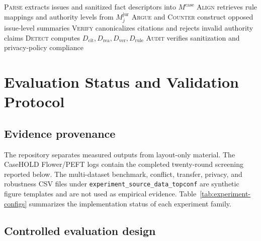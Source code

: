 \documentclass[preprint,12pt,authoryear]{elsarticle}
\begin{document}
\begin{algorithm}[t]
\caption{Policy-gated data-local multi-agent judicial deliberation}
\label{alg:deliberation}
\DontPrintSemicolon
{}
\textsc{Parse} extracts issues and sanitized fact descriptors into $M^{\mathrm{case}}$\;
\textsc{Align} retrieves rule mappings and authority levels from $M^{\mathrm{jur}}_j$\;
\textsc{Argue} and \textsc{Counter} construct opposed issue-level summaries\;
\textsc{Verify} canonicalizes citations and rejects invalid authority claims\;
\textsc{Detect} computes $D_{\mathrm{cit}},D_{\mathrm{rea}},D_{\mathrm{ver}},D_{\mathrm{rule}}$\;
\textsc{Audit} verifies sanitization and privacy-policy compliance\;
\end{algorithm}

\section{Evaluation Status and Validation Protocol}
\label{sec:experiments}

\subsection{Evidence provenance}

The repository separates measured outputs from layout-only material. The CaseHOLD Flower/PEFT logs contain the completed twenty-round screening reported below. The multi-dataset benchmark, conflict, transfer, privacy, and robustness CSV files under \texttt{experiment\_source\_data\_topconf} are synthetic figure templates and are not used as empirical evidence. Table~\ref{tab:experiment-configs} summarizes the implementation status of each experiment family.





\subsection{Controlled evaluation design}
\end{document}
